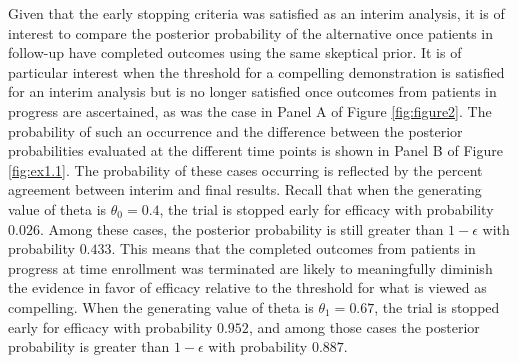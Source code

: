 \documentclass[12pt]{article}
\begin{document}
Given that the early stopping criteria was satisfied as an interim analysis, it is of interest to compare the posterior probability of the alternative once patients in follow-up have completed outcomes using the same skeptical prior.
%
It is of particular interest when the threshold for a compelling demonstration is satisfied for an interim analysis but is no longer satisfied once outcomes from patients in progress are ascertained, as was the case in Panel A of Figure \ref{fig:figure2}.
%
The probability of such an occurrence and the difference between the posterior probabilities evaluated at the different time points is shown in Panel B of Figure \ref{fig:ex1.1}.
%
The probability of these cases occurring is reflected by the percent agreement between interim and final results.
%
Recall that when the generating value of theta is $\theta_0=0.4$, the trial is stopped early for efficacy with probability $0.026$. Among these cases, the posterior probability is still greater than $1-\epsilon$ with probability $0.433$. 
%
This means that the completed outcomes from patients in progress at time enrollment was terminated are likely to meaningfully diminish the evidence in favor of efficacy relative to the threshold for what is viewed as compelling.
%
When the generating value of theta is $\theta_1=0.67$, the trial is stopped early for efficacy with probability $0.952$, and among those cases the posterior probability is  greater than $1-\epsilon$ with probability $0.887$.
\end{document}
